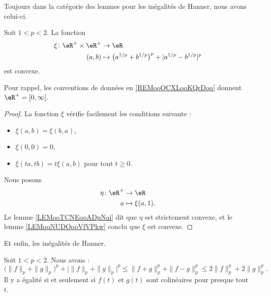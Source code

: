 Toujours dans la catégorie des lemmes pour les inégalités de Hanner, nous avons celui-ci.
\begin{lemma}
    Soit \( 1<p<2\). La fonction
    \begin{equation}
        \begin{aligned}
            \xi\colon \eR^+\times \eR^+&\to \eR \\
            (a,b)&\mapsto \big( a^{1/p}+b^{1/p} \big)^p+| a^{1/p}-b^{1/p} |^p
        \end{aligned}
    \end{equation}
    est convexe.
    
    Pour rappel, les conventions de données en \ref{REMooOCXLooKQrDoq} donnent \( \eR^+=\mathopen[ 0 , \infty \mathclose[\).
\end{lemma}

\begin{proof}
    La fonction \( \xi\) vérifie facilement les conditions suivante :
    \begin{itemize}
        \item \( \xi(a,b)=\xi(b,a)\),
        \item \( \xi(0,0)=0\),
        \item \( \xi(ta,tb)=t\xi(a,b)\) pour tout \( t\geq 0\).
    \end{itemize}
    Nous posons
    \begin{equation}
        \begin{aligned}
            \eta\colon \eR^+&\to \eR \\
            a&\mapsto \xi(a,1).
        \end{aligned}
    \end{equation}
    Le lemme \ref{LEMooTCNEooADpNai} dit que \( \eta\) est strictement convexe, et le lemme \ref{LEMooNUDOooVfVPkw} conclu que \( \xi\) est convexe.
\end{proof}

Et enfin, les inégalités de Hanner.
\begin{theorem}       \label{THOooZRRYooBTBQKW}
    Soit \( 1<p<2\). Nous avons :
    \begin{equation}
        \big( \| f \|_p+\| g \|_p \big)^p+\Big| \| f \|_p+\| g \|_p \Big|^p\leq \| f+g \|_p^p+\| f-g \|_p^p\leq 2\| f \|_p^p+2\| g \|_p^p.
    \end{equation}
    Il y a égalité si et seulement si \( f(t) \) et \( g(t)\) sont colinéaires pour presque tout \( t\).
\end{theorem}

